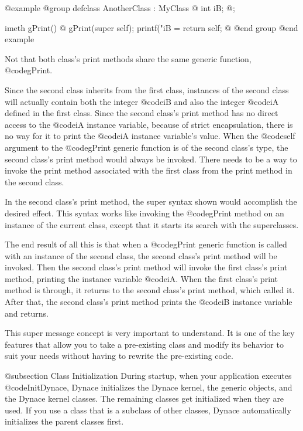 @example
@group
defclass  AnotherClass : MyClass  @{
        int     iB;
@};

imeth   gPrint()
@{
        gPrint(super self);
        printf("iB = %
        return self;
@}
@end group
@end example

Not that both class's print methods share the same generic function,
@code{gPrint}.

Since the second class inherits from the first class, instances of the
second class will actually contain both the integer @code{iB} and also
the integer @code{iA} defined in the first class.  Since the second
class's print method has no direct access to the @code{iA} instance
variable, because of strict encapsulation, there is no way for it to
print the @code{iA} instance variable's value.  When the @code{self}
argument to the @code{gPrint} generic function is of the second class's
type, the second class's print method would always be invoked.  There needs
to be a way to invoke the print method associated with the first class from
the print method in the second class.

In the second class's print method, the super syntax shown would
accomplish the desired effect.  This syntax works like invoking the
@code{gPrint} method on an instance of the current class, except that it
starts its search with the superclasses.

The end result of all this is that when a @code{gPrint} generic function is
called with an instance of the second class, the second class's print method
will be invoked.  Then the second class's print method will invoke the first
class's print method, printing the instance variable @code{iA}.  When the
first class's print method is through, it returns to the second class's
print method, which called it.  After that, the second class's print
method prints the @code{iB} instance variable and returns.

This super message concept is very important to understand.  It is one
of the key features that allow you to take a pre-existing class and
modify its behavior to suit your needs without having to rewrite the
pre-existing code.

@subsection Class Initialization
During startup, when your application executes @code{InitDynace},
Dynace initializes the Dynace kernel, the generic objects, and
the Dynace kernel classes.  The remaining classes get initialized
when they are used.  If you use a class that is a subclass of
other classes, Dynace automatically initializes the parent classes
first.


